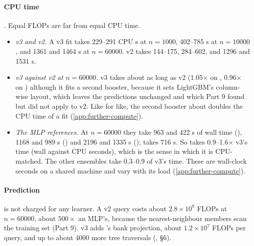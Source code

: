 \paragraph{CPU time} . Equal FLOPs are far from equal CPU time.
\begin{itemize}
\item \emph{v3 and v2.} A v3 fit takes 229--291 CPU s at $n=1000$, 402--785 s at $n=10000$, and 1361 and 1464 s at $n=60000$. v2 takes 144--175, 284--602, and 1296 and 1531 s.
\item \emph{v3 against v2 at $n=60000$.} v3 takes about as long as v2 (1.05$\times$ on , 0.96$\times$ on ) although it fits a second booster, because it sets LightGBM's column-wise layout, which leaves the predictions unchanged and which Part 9 found but did not apply to v2. Like for like, the second booster about doubles the CPU time of a fit (\cref{app:further-compute}).
\item \emph{The MLP references.} At $n=60000$ they take 963 and 422 s of wall time (), 1168 and 989 s () and 2196 and 1335 s ();  takes 716 s. So  takes 0.9--1.6$\times$ v3's time (wall against CPU seconds), which is the sense in which it is CPU-matched. The other ensembles take 0.3--0.9 of v3's time. These are wall-clock seconds on a shared machine and vary with its load (\cref{app:further-compute}).
\end{itemize}

\paragraph{Prediction} is not charged for any learner. A v2 query costs about $2.8\times10^8$ FLOPs at $n=60000$, about $500\times$ an MLP's, because the nearest-neighbour members scan the training set (Part 9). v3 adds 's bank projection, about $1.2\times10^7$ FLOPs per query, and up to about 4000 more tree traversals (, \S6).
